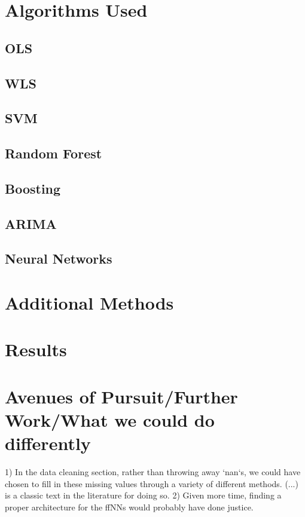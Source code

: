 \documentclass{article}
\begin{document}
\section{Algorithms Used}

\subsection{OLS}

\subsection{WLS}

\subsection{SVM}

\subsection{Random Forest}

\subsection{Boosting}

\subsection{ARIMA}

\subsection{Neural Networks}

\section{Additional Methods}

\section{Results}

\section{Avenues of Pursuit/Further Work/What we could do differently}

1) In the data cleaning section, rather than throwing away `nan`s, we could have chosen to fill in these missing values through a variety of different methods. (...) is a classic text in the literature for doing so. 
2) Given more time, finding a proper architecture for the ffNNs would probably have done justice. 
\end{document}
